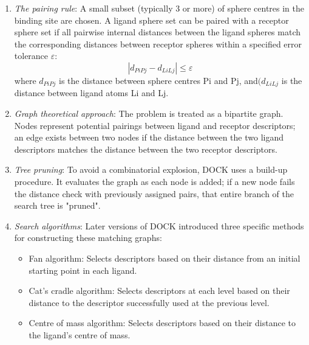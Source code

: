 \documentclass[12pt]{article}
\begin{document}
\begin{enumerate}

  \item \emph{The pairing rule}: A small subset (typically 3 or more) of sphere centres in the binding site are chosen. A ligand sphere set can be paired with a receptor sphere set if all pairwise internal distances between the ligand spheres match the corresponding distances between receptor spheres within a specified error tolerance $\varepsilon$:
  \begin{equation}
          \left| d_{PiPj} - d_{LiLj} \right| \le \varepsilon
  \end{equation}
        where $d_{PiPj}$ is the distance between sphere centres Pi and Pj, and$(d_{LiLj}$ is the distance between ligand atoms Li and Lj.
        
        \item \emph{Graph theoretical approach}: The problem is treated as a bipartite graph. Nodes represent potential pairings between ligand and receptor descriptors; an edge exists between two nodes if the distance between the two ligand descriptors matches the distance between the two receptor descriptors.
        
        \item \emph{Tree pruning}: To avoid a combinatorial explosion, DOCK uses a build-up procedure. It evaluates the graph as each node is added; if a new node fails the distance check with previously assigned pairs, that entire branch of the search tree is "pruned".
      
       \item \emph{Search algorithms}: Later versions of DOCK introduced three specific methods for constructing these matching graphs:
       
       \begin{itemize}
       \item Fan algorithm: Selects descriptors based on their distance from an initial starting point in each ligand.
        \item Cat's cradle algorithm: Selects descriptors at each level based on their distance to the descriptor successfully used at the previous level.
        \item Centre of mass algorithm: Selects descriptors based on their distance to the ligand's centre of mass.
       \end{itemize}

\end{enumerate}
\end{document}
